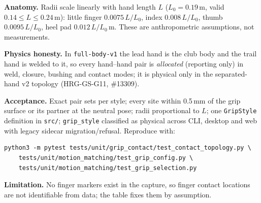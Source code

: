 \documentclass[11pt,a4paper]{article}
\begin{document}
\textbf{Anatomy.} Radii scale linearly with hand length $L$
($L_0=0.19$\,m, valid $0.14\le L\le0.24$\,m): little finger
$0.0075\,L/L_0$, index $0.008\,L/L_0$, thumb $0.0095\,L/L_0$, heel pad
$0.012\,L/L_0$\,m.  These are anthropometric assumptions, not measurements.

\textbf{Physics honesty.} In \texttt{full-body-v1} the lead hand is the club
body and the trail hand is welded to it, so every hand--hand pair is
\emph{allocated} (reporting only) in weld, closure, bushing and contact modes;
it is physical only in the separated-hand v2 topology (HRG-GS-G11, \#13309).

\textbf{Acceptance.} Exact pair sets per style; every site within 0.5\,mm of
the grip surface or its partner at the neutral pose; radii proportional to
$L$; one \texttt{GripStyle} definition in \texttt{src/}; \texttt{grip\_style}
classified as physical across CLI, desktop and web with legacy sidecar
migration/refusal.  Reproduce with:
\begin{verbatim}
python3 -m pytest tests/unit/grip_contact/test_contact_topology.py \
    tests/unit/motion_matching/test_grip_config.py \
    tests/unit/motion_matching/test_grip_selection.py
\end{verbatim}

\textbf{Limitation.} No finger markers exist in the capture, so finger contact
locations are not identifiable from data; the table fixes them by assumption.
\end{document}
